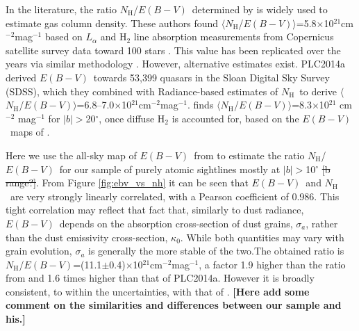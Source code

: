 \documentclass[preprint]{emulateapj}
\def\ebv{$E(B{-}V)$}
\def\NH{$N_\mathrm{H}$}
\begin{document}
In the literature, the ratio \NH/\ebv\ determined by \citet{Bohlin1978} is widely used to estimate gas column density. These authors found %
$\langle$\NH/\ebv$\rangle$=5.8$\times$10$^{21}$cm$^{-2}$mag$^{-1}$ %
based on $L_{\alpha}$ and H$_2$ line absorption measurements from Copernicus satellite survey data toward 100 stars \citep[see also][]{savage1977}. This value has been replicated over the years via similar methodology \citep[e.g.][]{shull85, diplas1997, rachford2009}. However, alternative estimates exist. PLC2014a derived \ebv\ towards 53,399 quasars in the Sloan Digital Sky Survey (SDSS), which they combined with Radiance-based estimates of \NH\ to derive $\langle$\NH/\ebv$\rangle$=$6.8$--7.0$\times$10$^{21}$cm$^{-2}$mag$^{-1}$. \citet{Liszt2014} finds $\langle$\NH/\ebv$\rangle$=8.3$\times$10$^{21}$ cm$^{-2}$ mag$^{-1}$ for $|b|$$>$20$^{\circ}$, once diffuse H$_2$ is accounted for, based on the \ebv\ maps of \citet{schlegel1998}. %

Here we use the all-sky map of \ebv\ from \cite{Schlafly2011} to estimate the ratio \NH/\ebv\ for our sample of purely atomic sightlines mostly at $|b|$$>$10$^{\circ}$ \sout{\color{magenta} [b range?]}. From Figure \ref{fig:ebv_vs_nh} it can be seen that \ebv\ and \NH\ are very strongly linearly correlated, with a Pearson coefficient of 0.986. %
{\color{magenta} This tight correlation may reflect that fact that, similarly to dust radiance, \ebv\ depends on the absorption cross-section of dust grains, $\sigma_{a}$, rather than the dust emissivity cross-section, $\kappa_0$. While both quantities may vary with grain evolution, $\sigma_{a}$ is generally the more stable of the two.}The obtained ratio is \NH/\ebv=(11.1$\pm$0.4)$\times$10$^{21}$cm$^{-2}$mag$^{-1}$, a factor 1.9 higher than the ratio from \citet{Bohlin1978} and 1.6 times higher than that of PLC2014a. {\color{magenta} However it is broadly consistent, to within the uncertainties, with that of \citet{Liszt2014}. \textbf{[Here add some comment on the similarities and differences between our sample and his.]}} %
\end{document}
